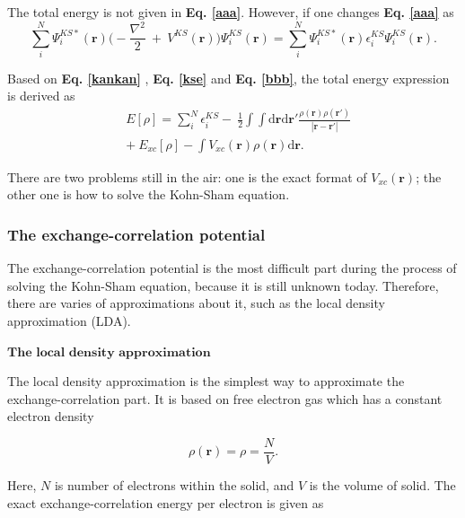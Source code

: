 \documentclass[a4paper, 12pt, titlepage,oneside,drop]{kthesis}
\begin{document}
The total energy is not given in \textbf{Eq. \ref{aaa}}. However, if one changes \textbf{Eq. \ref{aaa}} as 
\begin{equation}\label{bbb}
\sum\limits_i^N \Psi^{{KS}*}_{{i}}(\textbf{r}) \Big(-\frac{\nabla^{2}}{2}\ + \ V^{KS}(\textbf{r})\Big) \Psi^{{KS}}_{{i}}(\textbf{r}) = \sum\limits_i^N \Psi^{{KS}*}_{{i}}(\textbf{r}) \epsilon^{{KS}}_{{i}}  \Psi^{{KS}}_{{i}}(\textbf{r}).
\end{equation}

Based on \textbf{Eq. \ref{kankan}} , \textbf{Eq. \ref{kse}} and \textbf{Eq. \ref{bbb}}, the total energy expression is derived as
\begin{equation}\label{totalenergy}
\begin{split}
& E[\rho] = \sum\limits_i^N \epsilon^{{KS}}_{{i}} - \ \frac{1}{2} \int \int \mathrm{d} {\textbf{r}} \mathrm{d}{\textbf{r}'} \frac{\rho({\textbf{r}})\rho(\textbf{r}')}{|{\textbf{r}}-{\textbf{r}}'|} \\
&    + \ E_{xc}[\rho] - \int   V_{xc}(\textbf{r}) \rho({\textbf{r}}) \mathrm{d} {\textbf{r}}.
\end{split}
\end{equation}

There are two problems still in the air: one is the exact format of $V_{xc}(\textbf{r})$; the other one is how to solve the Kohn-Sham equation.

\subsubsection{The exchange-correlation potential}

The exchange-correlation potential is the most difficult part during the process of solving the Kohn-Sham equation, because it is still unknown today. Therefore, there
 are varies of approximations about it, such as the local density approximation (LDA).

$\textbf{The local density approximation}$

The local density approximation is the simplest way to approximate the exchange-correlation part. It is based on free electron gas which has a constant electron density 

\begin{equation}
 \rho(\textbf{r}) = \rho = \frac{N}{V}.
\end{equation}

Here, $N$ is number of electrons within the solid, and $V$ is the volume of solid. The exact exchange-correlation energy per electron is given as
\end{document}
